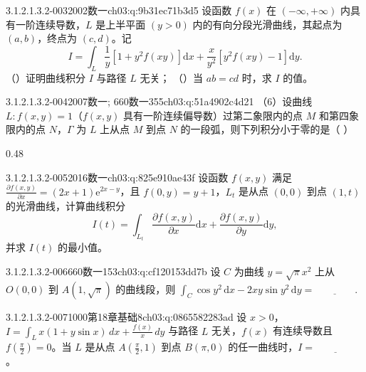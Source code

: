 \begin{q}{3.1.2.1.3.2-003}{2002数一}{ch03:q:9b31ec71b3d5}
设函数 $f(x)$ 在 $(-\infty,+\infty)$ 内具有一阶连续导数，$L$ 是上半平面 $(y>0)$ 内的有向分段光滑曲线，其起点为 $(a,b)$，终点为 $(c,d)$。记
\[
I=\int_L \frac{1}{y}\left[1+y^2 f(xy)\right]\mathrm{d}x+\frac{x}{y^2}\left[y^2 f(xy)-1\right]\mathrm{d}y.
\]
（）证明曲线积分 $I$ 与路径 $L$ 无关；
（）当 $ab=cd$ 时，求 $I$ 的值。
\end{q}

\begin{q}{3.1.2.1.3.2-004}{2007数一; 660数一355}{ch03:q:51a4902c4d21}
（6）设曲线 $L: f(x,y)=1$（$f(x,y)$ 具有一阶连续偏导数）过第二象限内的点 $M$ 和第四象限内的点 $N$，$\Gamma$ 为 $L$ 上从点 $M$ 到点 $N$ 的一段弧，则下列积分小于零的是（  ）
\begin{opts}{0.48}
\hfill{}\\[0.3ex]
\hfill{}
\end{opts}
\end{q}

\begin{q}{3.1.2.1.3.2-005}{2016数一}{ch03:q:825e910ae43f}
设函数 $f(x,y)$ 满足 $\frac{\partial f(x,y)}{\partial x}=(2x+1)\mathrm{e}^{2x-y}$，且 $f(0,y)=y+1$，$L_t$ 是从点 $(0,0)$ 到点 $(1,t)$ 的光滑曲线，计算曲线积分
\[ I(t)=\int_{L_t}\frac{\partial f(x,y)}{\partial x}\mathrm{d}x+\frac{\partial f(x,y)}{\partial y}\mathrm{d}y, \]
并求 $I(t)$ 的最小值。
\end{q}

\begin{q}{3.1.2.1.3.2-006}{660数一153}{ch03:q:cf120153dd7b}
设 $C$ 为曲线 $y=\sqrt{\pi}x^2$ 上从 $O(0,0)$ 到 $A(1,\sqrt{\pi})$ 的曲线段，则 $\displaystyle \int_C \cos y^2\,\mathrm{d}x-2xy\sin y^2\,\mathrm{d}y=\underline{\hspace{4em}}.$
\end{q}

\begin{q}{3.1.2.1.3.2-007}{1000第18章基础8}{ch03:q:0865582283ad}
设 $x>0$，$\displaystyle I=\int_L x(1+y\sin x)\,dx+\frac{f(x)}{x}\,dy$ 与路径 $L$ 无关，$f(x)$ 有连续导数且 $f\left(\frac{\pi}{2}\right)=0$。当 $L$ 是从点 $A\left(\frac{\pi}{2},1\right)$ 到点 $B(\pi,0)$ 的任一曲线时，$I=\underline{\hspace{4em}}$。
\end{q}

